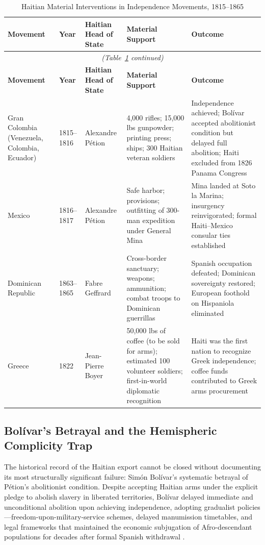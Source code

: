 \begin{longtable}{@{}p{3.2cm}p{1.5cm}p{2.6cm}p{4.8cm}p{2.8cm}@{}}
\caption{Haitian Material Interventions in Independence Movements, 1815--1865\label{tab:haitian_exports}}\\
\toprule
\textbf{Movement} & \textbf{Year} & \textbf{Haitian Head of State} & \textbf{Material Support} & \textbf{Outcome} \\
\midrule
\endfirsthead
\multicolumn{5}{c}{\textit{(Table~\ref{tab:haitian_exports} continued)}} \\
\toprule
\textbf{Movement} & \textbf{Year} & \textbf{Haitian Head of State} & \textbf{Material Support} & \textbf{Outcome} \\
\midrule
\endhead
\bottomrule
\endfoot
Gran Colombia (Venezuela, Colombia, Ecuador) & 1815--1816 & Alexandre Pétion & 4,000 rifles; 15,000 lbs gunpowder; printing press; ships; 300 Haitian veteran soldiers \cite{petion_bolivar_1816} & Independence achieved; Bolívar accepted abolitionist condition but delayed full abolition; Haiti excluded from 1826 Panama Congress \\[8pt]
Mexico & 1816--1817 & Alexandre Pétion & Safe harbor; provisions; outfitting of 300-man expedition under General Mina \cite{james_black_jacobins} & Mina landed at Soto la Marina; insurgency reinvigorated; formal Haiti--Mexico consular ties established \\[8pt]
Dominican Republic & 1863--1865 & Fabre Geffrard & Cross-border sanctuary; weapons; ammunition; combat troops to Dominican guerrillas \cite{haiti_constitution_1805} & Spanish occupation defeated; Dominican sovereignty restored; European foothold on Hispaniola eliminated \\[8pt]
Greece & 1822 & Jean-Pierre Boyer & 50,000 lbs of coffee (to be sold for arms); estimated 100 volunteer soldiers; first-in-world diplomatic recognition \cite{haiti_constitution_1805} & Haiti was the first nation to recognize Greek independence; coffee funds contributed to Greek arms procurement \\
\end{longtable}

\subsection{Bolívar's Betrayal and the Hemispheric Complicity Trap}
\label{sec:bolivar_betrayal}

The historical record of the Haitian export cannot be closed without documenting its most structurally significant failure: Simón Bolívar's systematic betrayal of Pétion's abolitionist condition. Despite accepting Haitian arms under the explicit pledge to abolish slavery in liberated territories, Bolívar delayed immediate and unconditional abolition upon achieving independence, adopting gradualist policies---freedom-upon-military-service schemes, delayed manumission timetables, and legal frameworks that maintained the economic subjugation of Afro-descendant populations for decades after formal Spanish withdrawal \cite{petion_bolivar_1816}.

